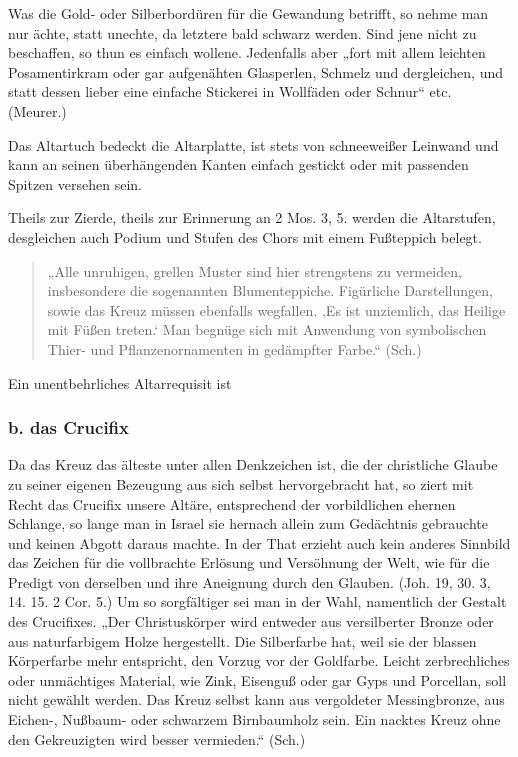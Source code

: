 Was die Gold- oder Silberbordüren für die Gewandung betrifft, so nehme man nur ächte, statt unechte, da letztere bald schwarz werden. Sind jene nicht zu beschaffen, so thun es einfach wollene. Jedenfalls aber „fort mit allem leichten Posamentirkram oder gar aufgenähten Glasperlen, Schmelz und dergleichen, und statt dessen lieber eine einfache Stickerei in Wollfäden oder Schnur“ etc. (Meurer.)

Das Altartuch bedeckt die Altarplatte, ist stets von schneeweißer Leinwand und kann an seinen überhängenden Kanten einfach gestickt oder mit passenden Spitzen versehen sein.

Theils zur Zierde, theils zur Erinnerung an 2 Mos. 3, 5. werden die Altarstufen, desgleichen auch Podium und Stufen des Chors mit einem Fußteppich belegt.

\begin{quote}
„Alle unruhigen, grellen Muster sind hier strengstens zu vermeiden, insbesondere die sogenannten Blumenteppiche. Figürliche Darstellungen, sowie das Kreuz müssen ebenfalls wegfallen. ‚Es ist unziemlich, das Heilige mit Füßen treten.‘ Man begnüge sich mit Anwendung von symbolischen Thier- und Pflanzenornamenten in gedämpfter Farbe.“ (Sch.)
\end{quote}

Ein unentbehrliches Altarrequisit ist

\subsubsection{b. das Crucifix}

Da das Kreuz das älteste unter allen Denkzeichen ist, die der christliche Glaube zu seiner eigenen Bezeugung aus sich selbst hervorgebracht hat, so ziert mit Recht das Crucifix unsere Altäre, entsprechend der vorbildlichen ehernen Schlange, so lange man in Israel sie hernach allein zum Gedächtnis gebrauchte und keinen Abgott daraus machte. In der That erzieht
auch kein anderes Sinnbild das Zeichen für die vollbrachte Erlösung und Versöhnung der Welt, wie für die Predigt von derselben und ihre Aneignung durch den Glauben. (Joh. 19, 30. 3, 14. 15. 2 Cor. 5.) Um so sorgfältiger sei man in der Wahl, namentlich der Gestalt des Crucifixes. „Der Christuskörper wird entweder aus versilberter Bronze oder aus naturfarbigem Holze hergestellt. Die Silberfarbe hat, weil sie der blassen Körperfarbe mehr entspricht, den Vorzug vor der Goldfarbe. Leicht zerbrechliches oder unmächtiges Material, wie Zink, Eisenguß oder gar Gyps und Porcellan, soll nicht gewählt werden. Das Kreuz selbst kann aus vergoldeter Messingbronze, aus Eichen-, Nußbaum- oder schwarzem Birnbaumholz sein. Ein nacktes Kreuz ohne den Gekreuzigten wird besser vermieden.“ (Sch.)


